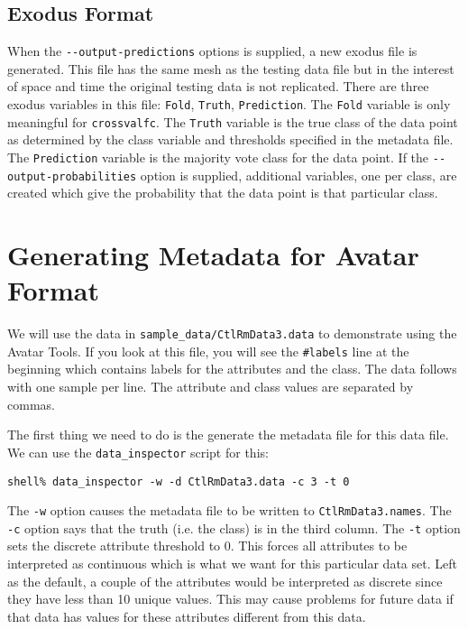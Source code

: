 \documentclass{article}
\begin{document}
\subsection{Exodus Format}

When the \verb=--output-predictions= options is supplied,
a new exodus file is generated. This file has the same mesh as the testing data file but in the
interest of space and time the original testing data is not replicated. There are three exodus variables
in this file: \verb=Fold=, \verb=Truth=, \verb=Prediction=. The \verb=Fold= variable
is only meaningful for \verb=crossvalfc=. The \verb=Truth= variable is the true class of the data point
as determined by the class variable and thresholds specified in the metadata file. The \verb=Prediction=
variable is the majority vote class for the data point. If the \verb=--output-probabilities= option is
supplied, additional variables, one per class, are created which give the probability that the data
point is that particular class.

\section{Generating Metadata for Avatar Format}

We will use the data in \verb=sample_data/CtlRmData3.data= to demonstrate using the Avatar Tools. If
you look at this file, you will see the \verb=#labels= line at the beginning which contains labels for
the attributes and the class. The data follows with one sample per line. The attribute and class
values are separated by commas.

The first thing we need to do is the generate the metadata file for this data file. We can use the
\verb=data_inspector= script for this:

\begin{verbatim}
shell% data_inspector -w -d CtlRmData3.data -c 3 -t 0
\end{verbatim}

The \verb=-w= option causes the metadata file to be written to \verb=CtlRmData3.names=. The
\verb=-c= option says that the truth (i.e. the class) is in the third column. The \verb=-t= option
sets the discrete attribute threshold to 0. This forces all attributes to be interpreted as
continuous which is what we want for this particular data set. Left as the default, a couple of the
attributes would be interpreted as discrete since they have less than 10 unique values. This may cause
problems for future data if that data has values for these attributes different from this data.
\end{document}
